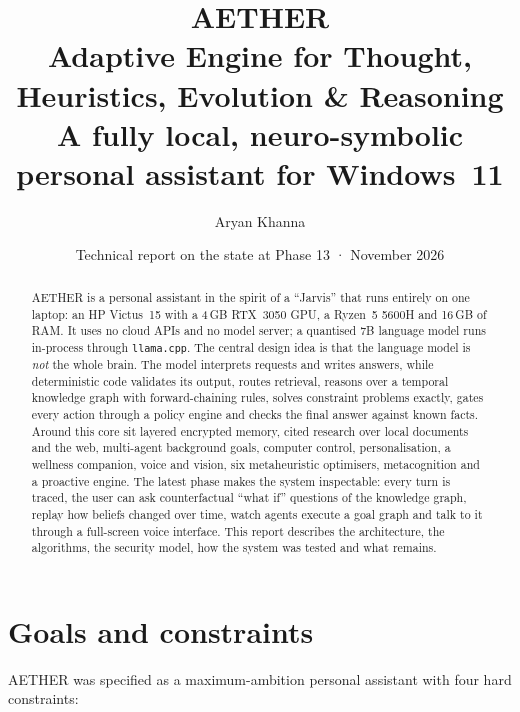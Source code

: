 \documentclass[11pt,a4paper]{article}
\title{\vspace{-1.2cm}\textbf{\color{aether!80!black}AETHER}\\[4pt]
\large Adaptive Engine for Thought, Heuristics, Evolution \& Reasoning\\[2pt]
\normalsize A fully local, neuro-symbolic personal assistant for Windows~11}
\author{Aryan Khanna}
\date{Technical report on the state at Phase 13 \quad·\quad 25 November 2026}
\newcommand{\code}[1]{\texttt{#1}}
\begin{document}
\maketitle
\thispagestyle{empty}

\begin{abstract}
\noindent AETHER is a personal assistant in the spirit of a ``Jarvis'' that runs entirely on one laptop: an HP Victus~15 with a 4\,GB RTX~3050 GPU, a Ryzen~5 5600H and 16\,GB of RAM. It uses no cloud APIs and no model server; a quantised 7B language model runs in-process through \code{llama.cpp}. The central design idea is that the language model is \emph{not} the whole brain. The model interprets requests and writes answers, while deterministic code validates its output, routes retrieval, reasons over a temporal knowledge graph with forward-chaining rules, solves constraint problems exactly, gates every action through a policy engine and checks the final answer against known facts. Around this core sit layered encrypted memory, cited research over local documents and the web, multi-agent background goals, computer control, personalisation, a wellness companion, voice and vision, six metaheuristic optimisers, metacognition and a proactive engine. The latest phase makes the system inspectable: every turn is traced, the user can ask counterfactual ``what if'' questions of the knowledge graph, replay how beliefs changed over time, watch agents execute a goal graph and talk to it through a full-screen voice interface. This report describes the architecture, the algorithms, the security model, how the system was tested and what remains.
\end{abstract}

\tableofcontents
\newpage

\section{Goals and constraints}

AETHER was specified as a maximum-ambition personal assistant with four hard constraints:
\end{document}
